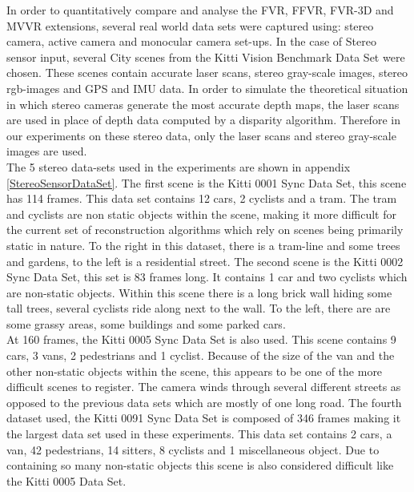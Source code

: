 
%

In order to quantitatively compare and analyse the FVR, FFVR, FVR-3D and MVVR extensions, several real world data sets were captured using: stereo camera, active camera and monocular camera set-ups. In the case of Stereo sensor input, several City scenes from the Kitti Vision Benchmark Data Set were chosen. These scenes contain accurate laser scans, stereo gray-scale images, stereo rgb-images and GPS and IMU data. In order to simulate the theoretical situation in which stereo cameras generate the most accurate depth maps, the laser scans are used in place of depth data computed by a disparity algorithm. Therefore in our experiments on these stereo data, only the laser scans and stereo gray-scale images are used. \\

The 5 stereo data-sets used in the experiments are shown in appendix \ref{StereoSensorDataSet}. The first scene is the Kitti 0001 Sync Data Set, this scene has 114 frames. This data set contains 12 cars, 2 cyclists and a tram. The tram and cyclists are non static objects within the scene, making it more difficult for the current set of reconstruction algorithms which rely on scenes being primarily static in nature. To the right in this dataset, there is a tram-line and some trees and gardens, to the left is a residential street. The second scene is the Kitti 0002 Sync Data Set, this set is 83 frames long. It contains 1 car and two cyclists which are non-static objects. Within this scene there is a long brick wall hiding some tall trees, several cyclists ride along next to the wall. To the left, there are are some grassy areas, some buildings and some parked cars. \\

At 160 frames, the Kitti 0005 Sync Data Set is also used. This scene contains 9 cars, 3 vans, 2 pedestrians and 1 cyclist. Because of the size of the van and the other non-static objects within the scene, this appears to be one of the more difficult scenes to register. The camera winds through several different streets as opposed to the previous data sets which are mostly of one long road. The fourth dataset used, the Kitti 0091 Sync Data Set is composed of 346 frames making it the largest data set used in these experiments. This data set contains 2 cars, a van, 42 pedestrians, 14 sitters, 8 cyclists and 1 miscellaneous object. Due to containing so many non-static objects this scene is also considered difficult like the Kitti 0005 Data Set. \\

